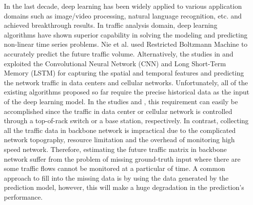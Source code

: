 In the last decade, deep learning has been widely applied to various application domains such as image/video processing, natural language recognition, etc. and achieved breakthrough results. In traffic analysis domain, deep learning algorithms have shown superior capability in solving the modeling and predicting non-linear time series problems. Nie et al. \cite{ref:nie2016traffic} used Restricted Boltzmann Machine to accurately predict the future traffic volume. Alternatively, the studies in \cite{ref:wang2017spatiotemporal} and \cite{ref:cao2018interactive} exploited the Convolutional Neural Network (CNN) and Long Short-Term Memory (LSTM) for capturing the spatial and temporal features and predicting the network traffic in data centers and cellular networks. Unfortunately, all of the existing algorithms proposed so far require the precise historical data as the input of the deep learning model. In the studies \cite{ref:cao2018interactive} and \cite{ref:wang2017spatiotemporal}, this requirement can easily be accomplished since the traffic in data center or cellular network is controlled through a top-of-rack switch or a base station, respectively. In contrast, collecting all the traffic data in backbone network is impractical due to the complicated network topography, resource limitation and the overhead of monitoring high speed network. Therefore, estimating the future traffic matrix in backbone network suffer from the problem of missing ground-truth input where there are some traffic flows cannot be monitored at a particular of time. A common approach to fill into the missing data is by using the data generated by the prediction model, however, this will make a huge degradation in the prediction’s performance. 

